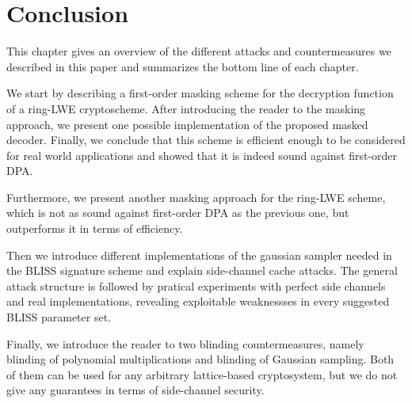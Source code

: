 %
%

\chapter{Conclusion}
This chapter gives an overview of the different attacks and countermeasures we described in this paper and summarizes the bottom line of each chapter.

We start by describing a first-order masking scheme for the decryption function of a \ac{ring-LWE} cryptoscheme. After introducing the reader to the masking approach, we present one possible implementation of the proposed masked decoder. Finally, we conclude that this scheme is efficient enough to be considered for real world applications and showed that it is indeed sound against first-order \ac{DPA}.

Furthermore, we present another masking approach for the \ac{ring-LWE} scheme, which is not as sound against first-order \ac{DPA} as the previous one, but outperforms it in terms of efficiency.

Then we introduce different implementations of the gaussian sampler needed in the BLISS signature scheme and explain side-channel cache attacks. The general attack structure is followed by pratical experiments with perfect side channels and real implementations, revealing exploitable weaknessses in every suggested BLISS parameter set.

Finally, we introduce the reader to two blinding countermeasures, namely blinding of polynomial multiplications and blinding of Gaussian sampling. Both of them can be used for any arbitrary lattice-based cryptosystem, but we do not give any guarantees in terms of side-channel security.


